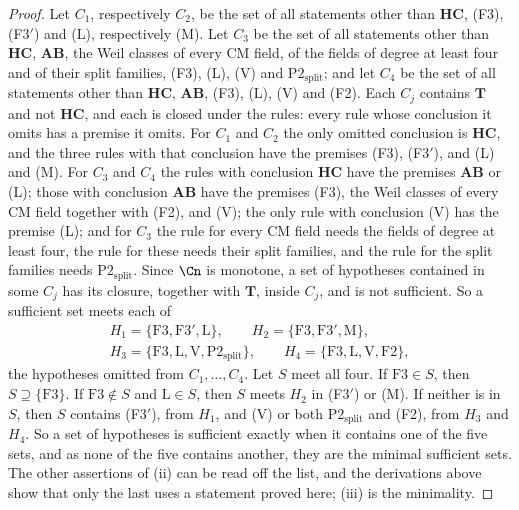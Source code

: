 \begin{proof}
Let $C_{1}$, respectively $C_{2}$, be the set of all statements other than
$\mathbf{HC}$, (F3), (F3$'$) and (L), respectively (M). Let $C_{3}$ be the
set of all statements other than $\mathbf{HC}$, $\mathbf{AB}$, the Weil
classes of every CM field, of the fields of degree at least four and of their
split families, (F3), (L), (V) and $\mathrm{P2}_{\mathrm{split}}$; and let
$C_{4}$ be the set of all statements other than $\mathbf{HC}$,
$\mathbf{AB}$, (F3), (L), (V) and (F2). Each $C_{j}$ contains $\mathbf{T}$
and not $\mathbf{HC}$, and each is closed under the rules: every rule whose
conclusion it omits has a premise it omits. For $C_{1}$ and $C_{2}$ the only
omitted conclusion is $\mathbf{HC}$, and the three rules with that
conclusion have the premises (F3), (F3$'$), and (L) and (M). For $C_{3}$
and $C_{4}$ the rules with conclusion $\mathbf{HC}$ have the premises
$\mathbf{AB}$ or (L); those with conclusion $\mathbf{AB}$ have the premises
(F3), the Weil classes of every CM field together with (F2), and (V); the
only rule with conclusion (V) has the premise (L); and for $C_{3}$ the rule
for every CM field needs the fields of degree at least four, the rule for
these needs their split families, and the rule for the split families needs
$\mathrm{P2}_{\mathrm{split}}$. Since $\Cn$ is monotone, a set of
hypotheses contained in some $C_{j}$ has its closure, together with
$\mathbf{T}$, inside $C_{j}$, and is not sufficient. So a sufficient set
meets each of
\begin{gather*}
  H_{1}=\{\mathrm{F3},\mathrm{F3}',\mathrm{L}\},\qquad
  H_{2}=\{\mathrm{F3},\mathrm{F3}',\mathrm{M}\},\\
  H_{3}=\{\mathrm{F3},\mathrm{L},\mathrm{V},\mathrm{P2}_{\mathrm{split}}\},\qquad
  H_{4}=\{\mathrm{F3},\mathrm{L},\mathrm{V},\mathrm{F2}\},
\end{gather*}
the hypotheses omitted from $C_{1},\dots,C_{4}$. Let $S$ meet all four. If
$\mathrm{F3}\in S$, then $S\supseteq\{\mathrm{F3}\}$. If $\mathrm{F3}\notin S$
and $\mathrm{L}\in S$, then $S$ meets $H_{2}$ in (F3$'$) or (M). If neither is
in $S$, then $S$ contains (F3$'$), from $H_{1}$, and (V) or both
$\mathrm{P2}_{\mathrm{split}}$ and (F2), from $H_{3}$ and $H_{4}$. So a set
of hypotheses is sufficient exactly when it contains one of the five sets,
and as none of the five contains another, they are the minimal sufficient
sets. The other assertions of (ii) can be read off the list, and the
derivations above show that only the last uses a statement proved here;
(iii) is the minimality.


\end{proof}
